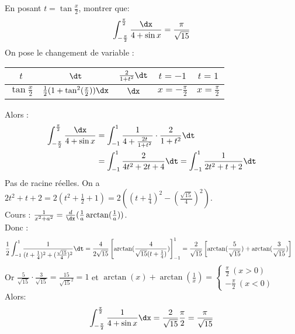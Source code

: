 \documentclass[11pt]{article}
\begin{document}
\begin{ex}{}{}
    En posant $t=\tan\frac{x}{2}$, montrer que: \begin{equation*}\int_{-\frac{\pi}{2}}^{\frac{\pi}{2}}\frac{\dx}{4+\sin x}=\frac{\pi}{\sqrt{15}}\end{equation*} 
    \tcblower
    On pose le changement de variable :
    \begin{center}
        \begin{tabular}{|c|c|c|c|c|}
            \hline
            $t$ & $\dt$ & $\frac{2}{1+t^2}\dt$ & $t=-1$ & $t=1$\\
            \hline
            $\tan\frac{x}{2}$ & $\frac{1}{2}(1+\tan^2(\frac{x}{2}))\dx$ & $\dx$ & $x=-\frac{\pi}{2}$ & $x=\frac{\pi}{2}$\\
            \hline
        \end{tabular}
    \end{center}
    Alors :
    \begin{align*}
        \int_{-\frac{\pi}{2}}^{\frac{\pi}{2}}\frac{\dx}{4+\sin x}&=\int_{-1}^1\frac{1}{4+\frac{2t}{1+t^2}}\cdot\frac{2}{1+t^2}\dt\\
        &=\int_{-1}^1\frac{2}{4t^2+2t+4}\dt
        =\int_{-1}^1\frac{1}{2t^2+t+2}\dt
    \end{align*}
    Pas de racine réelles. On a $2t^2+t+2=2(t^2+\frac{1}{2}+1)=2((t+\frac{1}{4})^2-(\frac{\sqrt{15}}{4})^2)$.\\
    Cours : $\frac{1}{x^2+a^2}=\frac{d}{\dx}(\frac{1}{a}\arctan(\frac{1}{a}))$.\\
    Donc :
    \begin{align*}
        \frac{1}{2}\int_{-1}^1\frac{1}{(t+\frac{1}{4})^2+(\frac{\sqrt{15}}{4})^2}\dt &= \frac{4}{2\sqrt{15}}\left[ \arctan(\frac{4}{\sqrt{15}(t+\frac{1}{4})})\right]_{-1}^1 = \frac{2}{\sqrt{15}}\left[ \arctan(\frac{5}{\sqrt{15}}) + \arctan(\frac{3}{\sqrt{15}}) \right]
    \end{align*}
    Or $\frac{5}{\sqrt{15}}\cdot\frac{3}{\sqrt{15}}=\frac{15}{\sqrt{15}^2}=1$ et $\arctan(x)+\arctan(\frac{1}{x})=\begin{cases}\frac{\pi}{2} ~ (x>0)\\-\frac{\pi}{2} ~ (x<0) \end{cases}$\\
    Alors: 
    \begin{equation*}
        \int_{-\frac{\pi}{2}}^{\frac{\pi}{2}}\frac{1}{4+\sin x}\dx=\frac{2}{\sqrt{15}}\frac{\pi}{2}=\frac{\pi}{\sqrt{15}}
    \end{equation*}
\end{ex}
\end{document}
